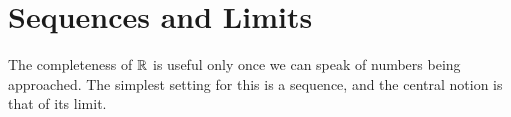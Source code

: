 \section{Sequences and Limits}

The completeness of $\mathbb{R}$ is useful only once we can speak of numbers being
approached. The simplest setting for this is a sequence, and the central
notion is that of its limit.


